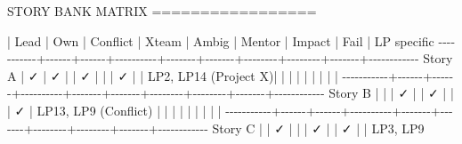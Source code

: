 \documentclass[11pt]{article}
\newenvironment{Shaded}{\begin{snugshade}}{\end{snugshade}}
\newcommand{\NormalTok}[1]{\textcolor[rgb]{0.81,0.81,0.76}{#1}}
\newcommand{\OperatorTok}[1]{\textcolor[rgb]{0.81,0.81,0.76}{#1}}
\begin{document}
\begin{Shaded}
\begin{Highlighting}[]
\NormalTok{STORY BANK MATRIX}
\OperatorTok{=================}

           \OperatorTok{|}\NormalTok{ Lead }\OperatorTok{|}\NormalTok{ Own  }\OperatorTok{|}\NormalTok{ Conflict }\OperatorTok{|}\NormalTok{ Xteam }\OperatorTok{|}\NormalTok{ Ambig }\OperatorTok{|}\NormalTok{ Mentor }\OperatorTok{|}\NormalTok{ Impact }\OperatorTok{|}\NormalTok{ Fail  }\OperatorTok{|}\NormalTok{ LP specific}
\OperatorTok{{-}{-}{-}{-}{-}{-}{-}{-}{-}{-}{-}+{-}{-}{-}{-}{-}{-}+{-}{-}{-}{-}{-}{-}+{-}{-}{-}{-}{-}{-}{-}{-}{-}{-}+{-}{-}{-}{-}{-}{-}{-}+{-}{-}{-}{-}{-}{-}{-}+{-}{-}{-}{-}{-}{-}{-}{-}+{-}{-}{-}{-}{-}{-}{-}{-}+{-}{-}{-}{-}{-}{-}{-}+{-}{-}{-}{-}{-}{-}{-}{-}{-}{-}{-}{-}}
\NormalTok{Story A    }\OperatorTok{|}\NormalTok{  ✓   }\OperatorTok{|}\NormalTok{  ✓   }\OperatorTok{|}          \OperatorTok{|}\NormalTok{  ✓    }\OperatorTok{|}       \OperatorTok{|}        \OperatorTok{|}\NormalTok{  ✓     }\OperatorTok{|}       \OperatorTok{|}\NormalTok{ LP2, LP14}
\NormalTok{(Project X)}\OperatorTok{|}      \OperatorTok{|}      \OperatorTok{|}          \OperatorTok{|}       \OperatorTok{|}       \OperatorTok{|}        \OperatorTok{|}        \OperatorTok{|}       \OperatorTok{|}
\OperatorTok{{-}{-}{-}{-}{-}{-}{-}{-}{-}{-}{-}+{-}{-}{-}{-}{-}{-}+{-}{-}{-}{-}{-}{-}+{-}{-}{-}{-}{-}{-}{-}{-}{-}{-}+{-}{-}{-}{-}{-}{-}{-}+{-}{-}{-}{-}{-}{-}{-}+{-}{-}{-}{-}{-}{-}{-}{-}+{-}{-}{-}{-}{-}{-}{-}{-}+{-}{-}{-}{-}{-}{-}{-}+{-}{-}{-}{-}{-}{-}{-}{-}{-}{-}{-}{-}}
\NormalTok{Story B    }\OperatorTok{|}      \OperatorTok{|}      \OperatorTok{|}\NormalTok{  ✓       }\OperatorTok{|}       \OperatorTok{|}\NormalTok{  ✓    }\OperatorTok{|}        \OperatorTok{|}        \OperatorTok{|}\NormalTok{  ✓    }\OperatorTok{|}\NormalTok{ LP13, LP9}
\NormalTok{(Conflict) }\OperatorTok{|}      \OperatorTok{|}      \OperatorTok{|}          \OperatorTok{|}       \OperatorTok{|}       \OperatorTok{|}        \OperatorTok{|}        \OperatorTok{|}       \OperatorTok{|}
\OperatorTok{{-}{-}{-}{-}{-}{-}{-}{-}{-}{-}{-}+{-}{-}{-}{-}{-}{-}+{-}{-}{-}{-}{-}{-}+{-}{-}{-}{-}{-}{-}{-}{-}{-}{-}+{-}{-}{-}{-}{-}{-}{-}+{-}{-}{-}{-}{-}{-}{-}+{-}{-}{-}{-}{-}{-}{-}{-}+{-}{-}{-}{-}{-}{-}{-}{-}+{-}{-}{-}{-}{-}{-}{-}+{-}{-}{-}{-}{-}{-}{-}{-}{-}{-}{-}{-}}
\NormalTok{Story C    }\OperatorTok{|}      \OperatorTok{|}\NormalTok{  ✓   }\OperatorTok{|}          \OperatorTok{|}       \OperatorTok{|}\NormalTok{  ✓    }\OperatorTok{|}        \OperatorTok{|}\NormalTok{  ✓     }\OperatorTok{|}       \OperatorTok{|}\NormalTok{ LP3, LP9}

\end{Highlighting}
\end{Shaded}
\end{document}
